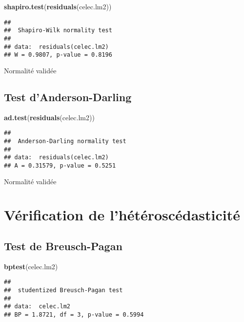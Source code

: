 \documentclass[
]{article}
\newenvironment{Shaded}{\begin{snugshade}}{\end{snugshade}}
\newcommand{\FunctionTok}[1]{\textcolor[rgb]{0.13,0.29,0.53}{\textbf{#1}}}
\newcommand{\NormalTok}[1]{#1}
\begin{document}
\begin{Shaded}
\begin{Highlighting}[]
\FunctionTok{shapiro.test}\NormalTok{(}\FunctionTok{residuals}\NormalTok{(celec.lm2))}
\end{Highlighting}
\end{Shaded}

\begin{verbatim}
## 
##  Shapiro-Wilk normality test
## 
## data:  residuals(celec.lm2)
## W = 0.9807, p-value = 0.8196
\end{verbatim}

Normalité validée

\subsection{Test d'Anderson-Darling}\label{test-danderson-darling}

\begin{Shaded}
\begin{Highlighting}[]
\FunctionTok{ad.test}\NormalTok{(}\FunctionTok{residuals}\NormalTok{(celec.lm2))}
\end{Highlighting}
\end{Shaded}

\begin{verbatim}
## 
##  Anderson-Darling normality test
## 
## data:  residuals(celec.lm2)
## A = 0.31579, p-value = 0.5251
\end{verbatim}

Normalité validée

\section{Vérification de
l'hétéroscédasticité}\label{vuxe9rification-de-lhuxe9tuxe9roscuxe9dasticituxe9}

\subsection{Test de Breusch-Pagan}\label{test-de-breusch-pagan}

\begin{Shaded}
\begin{Highlighting}[]
\FunctionTok{bptest}\NormalTok{(celec.lm2)}
\end{Highlighting}
\end{Shaded}

\begin{verbatim}
## 
##  studentized Breusch-Pagan test
## 
## data:  celec.lm2
## BP = 1.8721, df = 3, p-value = 0.5994
\end{verbatim}
\end{document}
